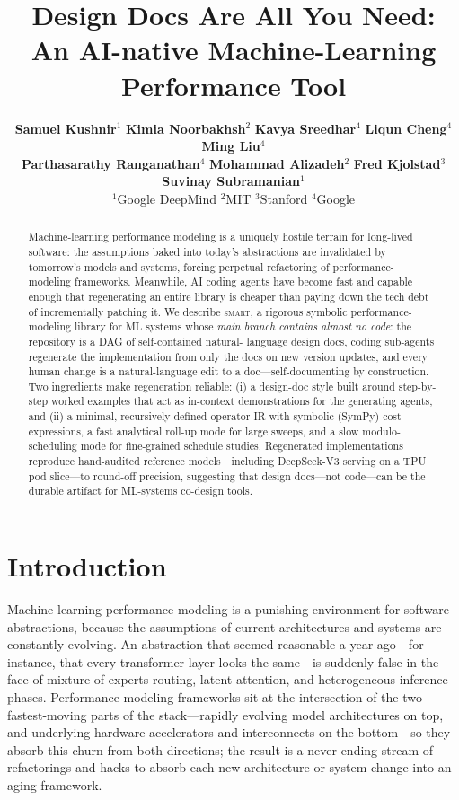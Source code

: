 \documentclass{article}
\title{Design Docs Are All You Need: \\
  An AI-native Machine-Learning Performance Tool}
\author{%
  \hspace{-1cm}
  \textbf{Samuel Kushnir}$^1$ \quad
  \textbf{Kimia Noorbakhsh}$^2$ \quad
  \textbf{Kavya Sreedhar}$^4$ \quad
  \textbf{Liqun Cheng}$^4$ \quad
  \textbf{Ming Liu}$^4$ \\
  \hspace{-0.5cm}
  \textbf{Parthasarathy Ranganathan}$^4$ \quad
  \textbf{Mohammad Alizadeh}$^2$ \quad
  \textbf{Fred Kjolstad}$^3$ \quad
  \textbf{Suvinay Subramanian}$^1$ \quad
  \\
  \vspace{0.2cm}
  $^1$Google DeepMind \quad
  $^2$MIT \quad
  $^3$Stanford \quad
  $^4$Google
}
\begin{document}
\maketitle
\begin{abstract}
Machine-learning performance modeling is a uniquely hostile terrain for long-lived
software: the assumptions baked into today's abstractions are invalidated
by tomorrow's models and systems, forcing perpetual refactoring of performance-
modeling frameworks. Meanwhile, AI coding agents have become fast and capable
enough that regenerating an entire library is cheaper than paying down the tech
debt of incrementally patching it. We describe \textsc{smart}, a rigorous
symbolic performance-modeling library for ML systems whose \emph{main branch
contains almost no code}: the repository is a DAG of self-contained natural-
language design docs, coding sub-agents regenerate the implementation from only the
docs on new version updates, and every human change is a
natural-language edit to a doc---self-documenting by construction. Two
ingredients make regeneration reliable: (i) a design-doc style built around
step-by-step worked examples that act as in-context demonstrations for the
generating agents, and (ii) a minimal, recursively
defined operator IR with symbolic (SymPy) cost expressions, a fast analytical
roll-up mode for large sweeps, and a slow modulo-scheduling mode for
fine-grained schedule studies. Regenerated implementations reproduce hand-audited
reference models---including DeepSeek-V3 serving on a TPU pod slice---to
round-off precision, suggesting that design docs---not code---can be the
durable artifact for ML-systems co-design tools.
\end{abstract}

\section{Introduction}
\label{sec:intro}

Machine-learning performance modeling is a punishing environment for software
abstractions, because the assumptions of current architectures and
systems are constantly evolving. An abstraction that seemed reasonable a year
ago---for instance, that every transformer layer looks the same---is suddenly
false in the face of mixture-of-experts routing, latent attention, and
heterogeneous inference phases. Performance-modeling frameworks sit at the
intersection of the two fastest-moving parts of the stack—rapidly evolving model architectures on top, and underlying hardware accelerators and interconnects on the bottom—so they absorb this
churn from both directions; the result is a never-ending stream of
refactorings and hacks to absorb each new architecture or system change into
an aging framework.
\end{document}
